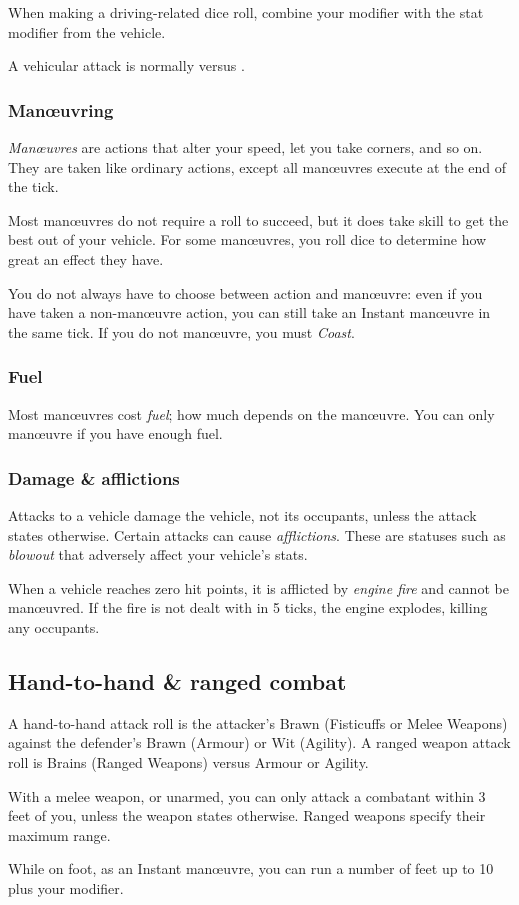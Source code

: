 \documentclass[10pt, a4paper, twocolumn]{article}
\begin{document}
When making a driving-related dice roll, combine your 
modifier with the stat modifier from the vehicle.

A vehicular attack is normally  versus .

\subsubsection{Man\oe{}uvring}
\emph{Man\oe{}uvres} are actions that alter your speed, let you take corners,
and so on. They are taken like ordinary actions, except all man\oe{}uvres
execute at the end of the tick.

Most man\oe{}uvres do not require a roll to succeed, but it does take skill to
get the best out of your vehicle. For some man\oe{}uvres, you roll dice to
determine how great an effect they have.

You do not always have to choose between action and man\oe{}uvre: even if you
have taken a non-man\oe{}uvre action, you can still take an Instant man\oe{}uvre
in the same tick. If you do not man\oe{}uvre, you must \emph{Coast}.

\subsubsection{Fuel}
Most man\oe{}uvres cost \emph{fuel}; how much depends on the man\oe{}uvre. You
can only man\oe{}uvre if you have enough fuel.

\subsubsection{Damage \& afflictions}
Attacks to a vehicle damage the vehicle, not its occupants, unless the attack
states otherwise. Certain attacks can cause \emph{afflictions}. These are
statuses such as \emph{blowout} that adversely affect your vehicle's stats.

When a vehicle reaches zero hit points, it is afflicted by \emph{engine fire}
and cannot be man\oe{}uvred. If the fire is not dealt with in 5 ticks, the
engine explodes, killing any occupants.

\subsection{Hand-to-hand \& ranged combat}
A hand-to-hand attack roll is the attacker's Brawn (Fisticuffs or Melee Weapons)
against the defender's Brawn (Armour) or Wit (Agility). A ranged weapon attack
roll is Brains (Ranged Weapons) versus Armour or Agility. 

With a melee weapon, or unarmed, you can only attack a combatant within 3 feet
of you, unless the weapon states otherwise. Ranged weapons specify their maximum
range. 

While on foot, as an Instant man\oe{}uvre, you can run a number of feet up to 10
plus your  modifier.
\end{document}
